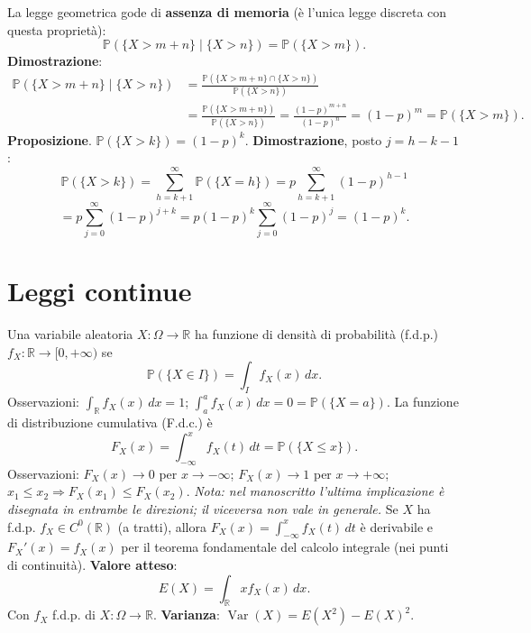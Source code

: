 \documentclass[11pt,a4paper]{article}
\newcommand{\pagina}[1]{\clearpage}
\begin{document}
\pagina{27}La legge geometrica gode di \textbf{assenza di memoria} (è l'unica legge discreta con questa proprietà):
\[\boxed{\mathbb P(\{X>m+n\}\mid\{X>n\})=\mathbb P(\{X>m\})}.\]
\textbf{Dimostrazione}:
\begin{align*}
\mathbb P(\{X>m+n\}\mid\{X>n\})&=\frac{\mathbb P(\{X>m+n\}\cap\{X>n\})}{\mathbb P(\{X>n\})}\\
&=\frac{\mathbb P(\{X>m+n\})}{\mathbb P(\{X>n\})}=\frac{(1-p)^{m+n}}{(1-p)^n}=(1-p)^m=\mathbb P(\{X>m\}).
\end{align*}
\textbf{Proposizione}. $\mathbb P(\{X>k\})=(1-p)^k$.
\textbf{Dimostrazione}, posto $j=h-k-1$:
\[\mathbb P(\{X>k\})=\sum_{h=k+1}^\infty\mathbb P(\{X=h\})=p\sum_{h=k+1}^\infty(1-p)^{h-1}\]\[=p\sum_{j=0}^\infty(1-p)^{j+k}=p(1-p)^k\sum_{j=0}^\infty(1-p)^j=(1-p)^k.\]
\section*{Leggi continue}
Una variabile aleatoria $X:\Omega\to\mathbb R$ ha funzione di densità di probabilità (f.d.p.) $f_X:\mathbb R\to[0,+\infty)$ se
\[\mathbb P(\{X\in I\})=\int_I f_X(x)\,dx.\]
Osservazioni: $\int_{\mathbb R}f_X(x)\,dx=1$; $\int_a^a f_X(x)\,dx=0=\mathbb P(\{X=a\})$.
La funzione di distribuzione cumulativa (F.d.c.) è
\[F_X(x)=\int_{-\infty}^x f_X(t)\,dt=\mathbb P(\{X\le x\}).\]
Osservazioni: $F_X(x)\to0$ per $x\to-\infty$; $F_X(x)\to1$ per $x\to+\infty$; $x_1\le x_2\Rightarrow F_X(x_1)\le F_X(x_2)$.
\emph{Nota: nel manoscritto l'ultima implicazione è disegnata in entrambe le direzioni; il viceversa non vale in generale.}
\pagina{28}Se $X$ ha f.d.p. $f_X\in C^0(\mathbb R)$ (a tratti), allora $\boxed{F_X(x)=\int_{-\infty}^x f_X(t)\,dt}$ è derivabile e $F_X'(x)=f_X(x)$ per il teorema fondamentale del calcolo integrale (nei punti di continuità).
\textbf{Valore atteso}:\[\boxed{E(X)=\int_{\mathbb R}xf_X(x)\,dx}.\] Con $f_X$ f.d.p. di $X:\Omega\to\mathbb R$.
\textbf{Varianza}: $\boxed{\operatorname{Var}(X)=E(X^2)-E(X)^2}$.
\end{document}
